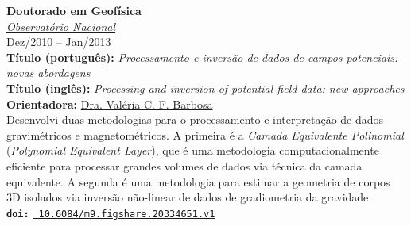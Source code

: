  \textbf{\large Doutorado em Geof{\'i}sica} \\
 \href{https://www.gov.br/observatorio/pt-br}{\textsl{Observat\'{o}rio Nacional}} \\
 Dez/2010 -- Jan/2013 \vspace{0.3\baselineskip} \\
\noindent \textbf{Título (portugu{\^e}s):} \textit{Processamento e invers\~{a}o de dados de campos potenciais: novas abordagens} \\
\noindent \textbf{Título (ingl{\^e}s):} \textit{Processing and inversion of potential field data: new approaches} \\
\noindent \textbf{Orientadora:} \href{https://orcid.org/0000-0002-9767-6044}{Dra. Val{\'e}ria C. F. Barbosa} \\
Desenvolvi duas metodologias para o 
processamento e interpretação de dados gravimétricos e magnetométricos. A primeira é
a \textit{Camada Equivalente Polinomial} (\textit{Polynomial Equivalent Layer}), que 
é uma metodologia computacionalmente eficiente para processar grandes volumes de dados 
via t{\'e}cnica da camada equivalente. A segunda {\'e} uma metodologia para estimar a
geometria de corpos 3D isolados via inversão não-linear de dados de gradiometria da gravidade. \\
\noindent \texttt{\textbf{doi:}}  \href{https://doi.org/10.6084/m9.figshare.20334651.v1}{\texttt{ 10.6084/m9.figshare.20334651.v1}} \\

\clearpage

